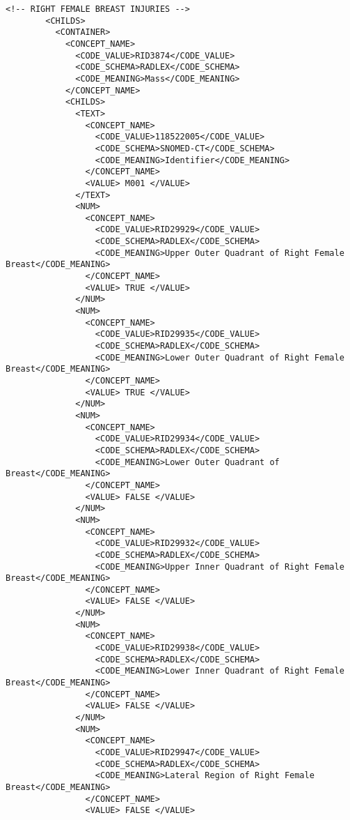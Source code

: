 \begin{lstlisting}[label=dicom-report,caption=Informe estructurado de una exploración de mama]
        <!-- RIGHT FEMALE BREAST INJURIES -->
        <CHILDS>
          <CONTAINER>
            <CONCEPT_NAME>
              <CODE_VALUE>RID3874</CODE_VALUE>
              <CODE_SCHEMA>RADLEX</CODE_SCHEMA>
              <CODE_MEANING>Mass</CODE_MEANING>
            </CONCEPT_NAME>
            <CHILDS>
              <TEXT>
                <CONCEPT_NAME>
                  <CODE_VALUE>118522005</CODE_VALUE>
                  <CODE_SCHEMA>SNOMED-CT</CODE_SCHEMA>
                  <CODE_MEANING>Identifier</CODE_MEANING>
                </CONCEPT_NAME>
                <VALUE> M001 </VALUE>
              </TEXT>
              <NUM>
                <CONCEPT_NAME>
                  <CODE_VALUE>RID29929</CODE_VALUE>
                  <CODE_SCHEMA>RADLEX</CODE_SCHEMA>
                  <CODE_MEANING>Upper Outer Quadrant of Right Female Breast</CODE_MEANING>
                </CONCEPT_NAME>
                <VALUE> TRUE </VALUE>
              </NUM>
              <NUM>
                <CONCEPT_NAME>
                  <CODE_VALUE>RID29935</CODE_VALUE>
                  <CODE_SCHEMA>RADLEX</CODE_SCHEMA>
                  <CODE_MEANING>Lower Outer Quadrant of Right Female Breast</CODE_MEANING>
                </CONCEPT_NAME>
                <VALUE> TRUE </VALUE>
              </NUM>
              <NUM>
                <CONCEPT_NAME>
                  <CODE_VALUE>RID29934</CODE_VALUE>
                  <CODE_SCHEMA>RADLEX</CODE_SCHEMA>
                  <CODE_MEANING>Lower Outer Quadrant of Breast</CODE_MEANING>
                </CONCEPT_NAME>
                <VALUE> FALSE </VALUE>
              </NUM>
              <NUM>
                <CONCEPT_NAME>
                  <CODE_VALUE>RID29932</CODE_VALUE>
                  <CODE_SCHEMA>RADLEX</CODE_SCHEMA>
                  <CODE_MEANING>Upper Inner Quadrant of Right Female Breast</CODE_MEANING>
                </CONCEPT_NAME>
                <VALUE> FALSE </VALUE>
              </NUM>
              <NUM>
                <CONCEPT_NAME>
                  <CODE_VALUE>RID29938</CODE_VALUE>
                  <CODE_SCHEMA>RADLEX</CODE_SCHEMA>
                  <CODE_MEANING>Lower Inner Quadrant of Right Female Breast</CODE_MEANING>
                </CONCEPT_NAME>
                <VALUE> FALSE </VALUE>
              </NUM>
              <NUM>
                <CONCEPT_NAME>
                  <CODE_VALUE>RID29947</CODE_VALUE>
                  <CODE_SCHEMA>RADLEX</CODE_SCHEMA>
                  <CODE_MEANING>Lateral Region of Right Female Breast</CODE_MEANING>
                </CONCEPT_NAME>
                <VALUE> FALSE </VALUE>

\end{lstlisting}
